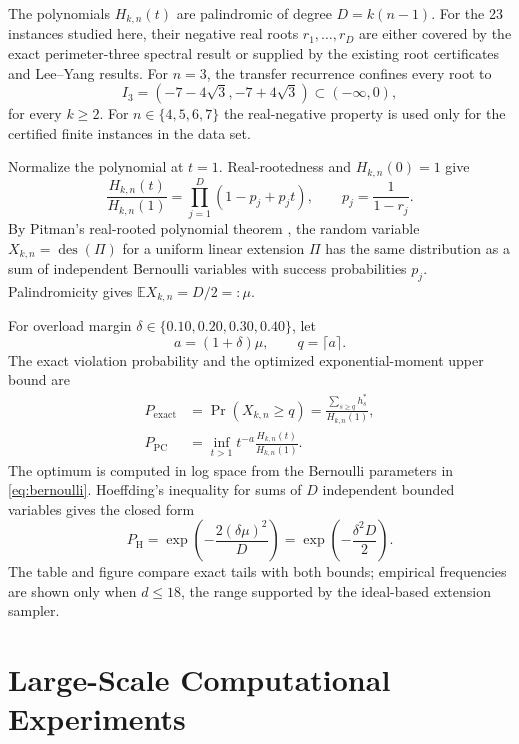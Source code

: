 \documentclass[10pt]{article}
\newcommand{\des}{\operatorname{des}}
\begin{document}
The polynomials $H_{k,n}(t)$ are palindromic of degree $D=k(n-1)$. For the 23 instances studied here, their negative real roots $r_1,\ldots,r_D$ are either covered by the exact perimeter-three spectral result or supplied by the existing root certificates and Lee--Yang results. For $n=3$, the transfer recurrence confines every root to
\[
  I_3=(-7-4\sqrt{3},-7+4\sqrt{3})\subset(-\infty,0),
\]
for every $k\ge2$. For $n\in\{4,5,6,7\}$ the real-negative property is used only for the certified finite instances in the data set.

Normalize the polynomial at $t=1$. Real-rootedness and $H_{k,n}(0)=1$ give
\begin{equation}
  \frac{H_{k,n}(t)}{H_{k,n}(1)}
  =\prod_{j=1}^{D}(1-p_j+p_jt),\qquad
  p_j=\frac{1}{1-r_j}.
  \label{eq:bernoulli}
\end{equation}
By Pitman's real-rooted polynomial theorem \cite{Pitman1997}, the random variable $X_{k,n}=\des(\Pi)$ for a uniform linear extension $\Pi$ has the same distribution as a sum of independent Bernoulli variables with success probabilities $p_j$. Palindromicity gives $\mathbb{E}X_{k,n}=D/2=:\mu$.

For overload margin $\delta\in\{0.10,0.20,0.30,0.40\}$, let
\[
  a=(1+\delta)\mu,\qquad q=\lceil a\rceil.
\]
The exact violation probability and the optimized exponential-moment upper bound are
\begin{align}
  P_{\mathrm{exact}}
    &=\Pr(X_{k,n}\ge q)
      =\frac{\sum_{s\ge q}h_s^*}{H_{k,n}(1)},\\
  P_{\mathrm{PC}}
    &=\inf_{t>1}t^{-a}\frac{H_{k,n}(t)}{H_{k,n}(1)}.
  \label{eq:chernoff}
\end{align}
The optimum is computed in log space from the Bernoulli parameters in \eqref{eq:bernoulli}. Hoeffding's inequality for sums of $D$ independent bounded variables \cite{Hoeffding1963} gives the closed form
\begin{equation}
  P_{\mathrm{H}}
  =\exp\!\left(-\frac{2(\delta\mu)^2}{D}\right)
  =\exp\!\left(-\frac{\delta^2D}{2}\right).
  \label{eq:hoeffding}
\end{equation}
The table and figure compare exact tails with both bounds; empirical frequencies are shown only when $d\le18$, the range supported by the ideal-based extension sampler.

\section{Large-Scale Computational Experiments}
\end{document}
